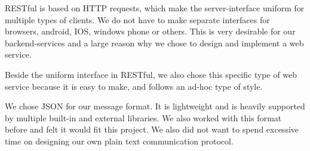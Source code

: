 RESTful is based on HTTP requests, which make the server-interface uniform for multiple types of clients. We do not have to make separate interfaces for browsers, android, IOS, windows phone or others. This is very desirable for our backend-services and a large reason why we chose to design and implement a web service. 

Beside the uniform interface in RESTful, we also chose this specific type of web service because it is easy to make, and follows an ad-hoc type of style\cite{DecidingOnRESTful}. 

We chose JSON for our message format. It is lightweight and is heavily supported by multiple built-in and external libraries. We also worked with this format before and felt it would fit this project. We also did not want to spend excessive time on designing our own plain text communication protocol.
